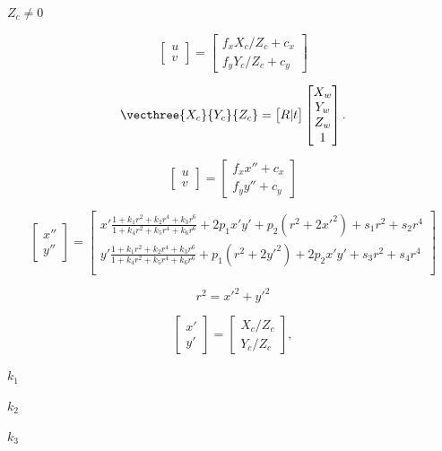 \documentclass{article}
\begin{document}
$Z_c \ne 0$
\pagebreak

\[\begin{bmatrix}
u \\
v
\end{bmatrix} = \begin{bmatrix}
f_x X_c/Z_c + c_x \\
f_y Y_c/Z_c + c_y
\end{bmatrix}\]
\pagebreak

\[\vecthree{X_c}{Y_c}{Z_c} = \begin{bmatrix}
R|t
\end{bmatrix} \begin{bmatrix}
X_w \\
Y_w \\
Z_w \\
1
\end{bmatrix}.\]
\pagebreak

\[\begin{bmatrix}
u \\
v
\end{bmatrix} = \begin{bmatrix}
f_x x'' + c_x \\
f_y y'' + c_y
\end{bmatrix}\]
\pagebreak

\[\begin{bmatrix}
x'' \\
y''
\end{bmatrix} = \begin{bmatrix}
x' \frac{1 + k_1 r^2 + k_2 r^4 + k_3 r^6}{1 + k_4 r^2 + k_5 r^4 + k_6 r^6} + 2 p_1 x' y' + p_2(r^2 + 2 x'^2) + s_1 r^2 + s_2 r^4 \\
y' \frac{1 + k_1 r^2 + k_2 r^4 + k_3 r^6}{1 + k_4 r^2 + k_5 r^4 + k_6 r^6} + p_1 (r^2 + 2 y'^2) + 2 p_2 x' y' + s_3 r^2 + s_4 r^4 \\
\end{bmatrix}\]
\pagebreak

\[r^2 = x'^2 + y'^2\]
\pagebreak

\[\begin{bmatrix}
x'\\
y'
\end{bmatrix} = \begin{bmatrix}
X_c/Z_c \\
Y_c/Z_c
\end{bmatrix},\]
\pagebreak

$k_1$
\pagebreak

$k_2$
\pagebreak

$k_3$
\pagebreak
\end{document}
